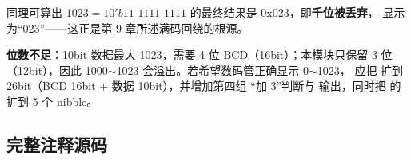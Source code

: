 同理可算出 $1023=10'b11\_1111\_1111$ 的最终结果是 0x023，即\textbf{千位被丢弃}，
显示为“023”——这正是第 9 章所述满码回绕的根源。

\begin{warnbox}
\textbf{位数不足}：10bit 数据最大 1023，需要 4 位 BCD（16bit）；本模块只保留 3 位
（12bit），因此 1000$\sim$1023 会溢出。若希望数码管正确显示 0$\sim$1023，
应把  扩到 26bit（BCD 16bit + 数据 10bit），并增加第四组
“加 3”判断与  输出，同时把  的  扩到 5 个 nibble。
\end{warnbox}

\subsection{完整注释源码}


